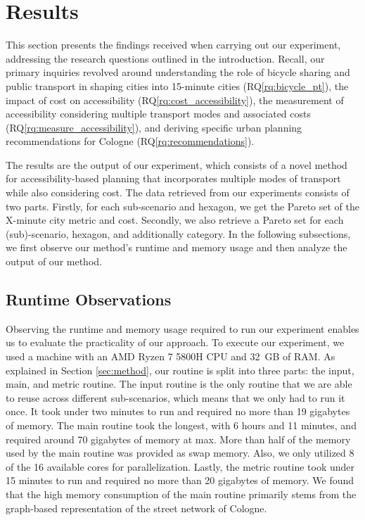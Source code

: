 \clearpage
\section{Results}
\label{sec:results}

This section presents the findings received when carrying out our experiment, addressing the research questions outlined in the introduction.
Recall, our primary inquiries revolved around understanding the role of bicycle sharing and public transport in shaping cities into 15-minute cities (RQ\ref{rq:bicycle_pt}), the impact of cost on accessibility (RQ\ref{rq:cost_accessibility}), the measurement of accessibility considering multiple transport modes and associated costs (RQ\ref{rq:measure_accessibility}), and deriving specific urban planning recommendations for Cologne (RQ\ref{rq:recommendations}).

The results are the output of our experiment, which consists of a novel method for accessibility-based planning that incorporates multiple modes of transport while also considering cost.
The data retrieved from our experiments consists of two parts.
Firstly, for each sub-scenario and hexagon, we get the Pareto set of the X-minute city metric and cost.
Secondly, we also retrieve a Pareto set for each (sub)-scenario, hexagon, and additionally category.
In the following subsections, we first observe our method's runtime and memory usage and then analyze the output of our method.

\subsection{Runtime Observations}
\label{subsec:runtime_observations}

Observing the runtime and memory usage required to run our experiment enables us to evaluate the practicality of our approach.
To execute our experiment, we used a machine with an AMD Ryzen 7 5800H CPU and 32 GB of RAM.
As explained in Section \ref{sec:method}, our routine is split into three parts: the input, main, and metric routine.
The input routine is the only routine that we are able to reuse across different sub-scenarios, which means that we only had to run it once.
It took under two minutes to run and required no more than 19 gigabytes of memory.
The main routine took the longest, with 6 hours and 11 minutes, and required around 70 gigabytes of memory at max.
More than half of the memory used by the main routine was provided as swap memory.
Also, we only utilized 8 of the 16 available cores for parallelization.
Lastly, the metric routine took under 15 minutes to run and required no more than 20 gigabytes of memory.
We found that the high memory consumption of the main routine primarily stems from the graph-based representation of the street network of Cologne.

